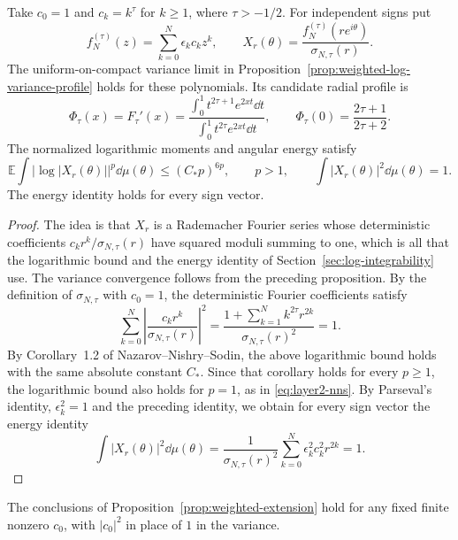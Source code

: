 \begin{proposition}\label{prop:weighted-extension}
Take $c_0=1$ and $c_k=k^\tau$ for $k\ge1$, where $\tau>-1/2$.
For independent signs put
\[
 f_N^{(\tau)}(z)=\sum_{k=0}^N\epsilon_kc_kz^k,\qquad
 X_r(\theta)=\frac{f_N^{(\tau)}(re^{i\theta})}{\sigma_{N,\tau}(r)}.
\]
The uniform-on-compact variance limit in
Proposition~\ref{prop:weighted-log-variance-profile} holds for these polynomials.
Its candidate radial profile is
\[
 \Phi_\tau(x)=F_\tau'(x)
   =\frac{\int_0^1t^{2\tau+1}e^{2xt}\dd t}
          {\int_0^1t^{2\tau}e^{2xt}\dd t},\qquad
 \Phi_\tau(0)=\frac{2\tau+1}{2\tau+2}.
\]
The normalized logarithmic moments and angular energy satisfy
\[
 \mathbb E\int|\log|X_r(\theta)||^p\dd\mu(\theta)
       \le(C_*p)^{6p},\qquad p>1,
 \qquad
 \int|X_r(\theta)|^2\dd\mu(\theta)=1.
\]
The energy identity holds for every sign vector.
\end{proposition}
\begin{proof}
The idea is that $X_r$ is a Rademacher Fourier series whose deterministic
coefficients $c_kr^k/\sigma_{N,\tau}(r)$ have squared moduli summing to
one, which is all that the logarithmic bound and the energy identity of
Section~\ref{sec:log-integrability} use.
The variance convergence follows from the preceding proposition.
By the definition of $\sigma_{N,\tau}$ with $c_0=1$, the deterministic
Fourier coefficients satisfy
\[
 \sum_{k=0}^N\left|\frac{c_kr^k}{\sigma_{N,\tau}(r)}\right|^2
 =\frac{1+\sum_{k=1}^Nk^{2\tau}r^{2k}}{\sigma_{N,\tau}(r)^2}=1.
\]
By Corollary~1.2 of Nazarov--Nishry--Sodin, the above logarithmic
bound holds with the same absolute constant $C_*$.
Since that corollary holds for every $p\ge1$, the logarithmic bound also
holds for $p=1$, as in \eqref{eq:layer2-nns}.
By Parseval's identity, $\epsilon_k^2=1$ and the preceding identity, we
obtain for every sign vector the energy identity
\[
 \int|X_r(\theta)|^2\dd\mu(\theta)
 =\frac1{\sigma_{N,\tau}(r)^2}\sum_{k=0}^N\epsilon_k^2c_k^2r^{2k}=1.
\]
\end{proof}

The conclusions of Proposition~\ref{prop:weighted-extension} hold for any fixed finite nonzero $c_0$,
with $|c_0|^2$ in place of $1$ in the variance.
